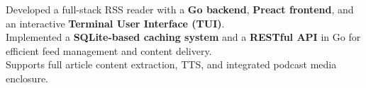 \documentclass[]{Nikhil_Kadiyan_Resume}
\begin{document}

\pt Developed a full-stack RSS reader with a \textbf{Go backend}, \textbf{Preact frontend}, and an interactive \textbf{Terminal User Interface (TUI)}.\\
\pt Implemented a \textbf{SQLite-based caching system} and a \textbf{RESTful API} in Go for efficient feed management and content delivery.\\
\pt Supports full article content extraction, TTS, and integrated podcast media enclosure.\\
\sectionsep

\end{document}
